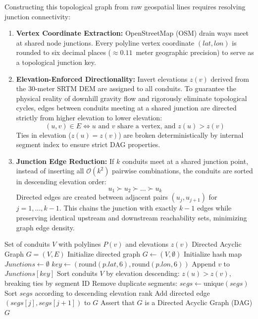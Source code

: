 \documentclass[12pt,a4paper]{report}
\begin{document}
Constructing this topological graph from raw geospatial lines requires resolving junction connectivity:
\begin{enumerate}
    \item \textbf{Vertex Coordinate Extraction:} OpenStreetMap (OSM) drain ways meet at shared node junctions. Every polyline vertex coordinate $(lat, lon)$ is rounded to six decimal places ($\approx 0.11$~meter geographic precision) to serve as a topological junction key.
    \item \textbf{Elevation-Enforced Directionality:} Invert elevations $z(v)$ derived from the 30-meter SRTM DEM are assigned to all conduits. To guarantee the physical reality of downhill gravity flow and rigorously eliminate topological cycles, edges between conduits meeting at a shared junction are directed strictly from higher elevation to lower elevation:
    \begin{equation}
    (u, v) \in E \iff u \text{ and } v \text{ share a vertex, and } z(u) > z(v)
    \end{equation}
    Ties in elevation ($z(u) = z(v)$) are broken deterministically by internal segment index to ensure strict DAG properties.
    \item \textbf{Junction Edge Reduction:} If $k$ conduits meet at a shared junction point, instead of inserting all $\mathcal{O}(k^2)$ pairwise combinations, the conduits are sorted in descending elevation order:
    \begin{equation}
    u_1 \succ u_2 \succ \dots \succ u_k
    \end{equation}
    Directed edges are created between adjacent pairs $(u_j, u_{j+1})$ for $j = 1, \dots, k-1$. This chains the junction with exactly $k-1$ edges while preserving identical upstream and downstream reachability sets, minimizing graph edge density.
\end{enumerate}

\begin{algorithm}[h!]
\caption{Elevation-Enforced Drainage DAG Construction}
\label{alg:dag_construction}
\begin{algorithmic}[1]
\REQUIRE Set of conduits $V$ with polylines $P(v)$ and elevations $z(v)$
\ENSURE Directed Acyclic Graph $G = (V, E)$
\STATE Initialize directed graph $G \leftarrow (V, \emptyset)$
\STATE Initialize hash map $Junctions \leftarrow \emptyset$ 
        \STATE $key \leftarrow (\text{round}(p.lat, 6), \text{round}(p.lon, 6))$
        \STATE Append $v$ to $Junctions[key]$
    \ENDFOR
\ENDFOR
\STATE Sort conduits $V$ by elevation descending: $z(u) > z(v)$, breaking ties by segment ID
    \STATE Remove duplicate segments: $segs \leftarrow \text{unique}(segs)$
        \STATE Sort $segs$ according to descending elevation rank
            \STATE Add directed edge $(segs[j], segs[j+1])$ to $G$
        \ENDFOR
    \ENDIF
\ENDFOR
\STATE Assert that $G$ is a Directed Acyclic Graph (DAG)
\RETURN $G$
\end{algorithmic}
\end{algorithm}
\end{document}
